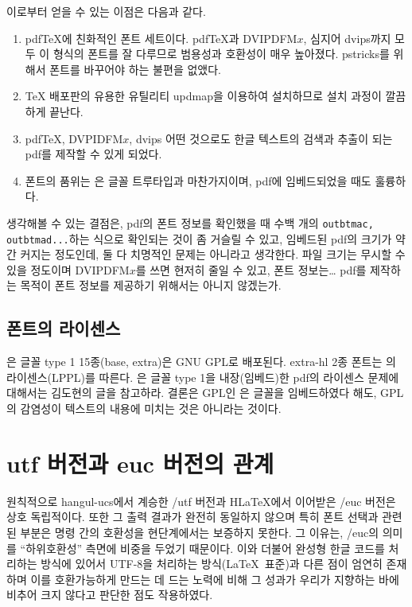 이로부터 얻을 수 있는 이점은 다음과 같다.
\begin{enumerate}
\item
pdf\TeX 에 친화적인 폰트 세트이다. pdf\TeX 과 DVIPDFM$x$, 심지어
dvips까지 모두 이 형식의 폰트를 잘 다루므로 범용성과 호환성이 매우
높아졌다. pstricks를 위해서 폰트를 바꾸어야 하는 불편을 없앴다.
\item
\TeX{} 배포판의 유용한 유틸리티 updmap을 이용하여 설치하므로 설치
과정이 깔끔하게 끝난다.
\item
pdf\TeX, DVPIDFM$x$, dvips 어떤 것으로도 한글 텍스트의 검색과
추출이 되는 pdf를 제작할 수 있게 되었다.
\item
폰트의 품위는 은 글꼴 트루타입과 마찬가지이며, pdf에 임베드되었을 때도
훌륭하다.
\end{enumerate}

생각해볼 수 있는 결점은, pdf의 폰트 정보를 확인했을 때 수백 개의
\texttt{outbtmac, outbtmad...}하는 식으로 확인되는 것이 좀
거슬릴 수 있고, 임베드된 pdf의 크기가 약간 커지는 정도인데,
둘 다 치명적인 문제는 아니라고 생각한다. 파일 크기는 무시할 수 있을
정도이며 DVIPDFM$x$를 쓰면 현저히 줄일 수 있고, 폰트 정보는\ldots{}
pdf를 제작하는 목적이 폰트 정보를 제공하기 위해서는 아니지 않겠는가.

\subsection{폰트의 라이센스}

은 글꼴 type 1 15종(base, extra)은 GNU GPL로 배포된다. extra-hl 2종 폰트는 \kotex 의
라이센스(LPPL)를 따른다. 
은 글꼴 type 1을 내장(임베드)한 pdf의 라이센스 문제에 대해서는 김도현의
글\cite{dohyun}을 참고하라. 결론은 GPL인 은 글꼴을 임베드하였다 해도, GPL의 감염성이
텍스트의 내용에 미치는 것은 아니라는 것이다. 

\section{utf 버전과 euc 버전의 관계}

원칙적으로 hangul-ucs에서 계승한 \kotex/utf 버전과 H\LaTeX 에서
이어받은 \kotex/euc 버전은 상호 독립적이다. 또한 그 출력 결과가
완전히 동일하지 않으며 특히 폰트 선택과 관련된 부분은 명령 간의
호환성을 현단계에서는 보증하지 못한다.
그 이유는, \kotex/euc의 의미를 ``하위호환성'' 측면에 비중을 두었기
때문이다. 이와 더불어 완성형 한글 코드를 처리하는 방식에 있어서
UTF-8을 처리하는 방식(\LaTeX\ 표준)과 다른 점이 엄연히 존재하며
이를 호환가능하게 만드는 데 드는 노력에 비해 그 성과가 우리가 지향하는
바에 비추어 크지 않다고 판단한 점도 작용하였다. 

